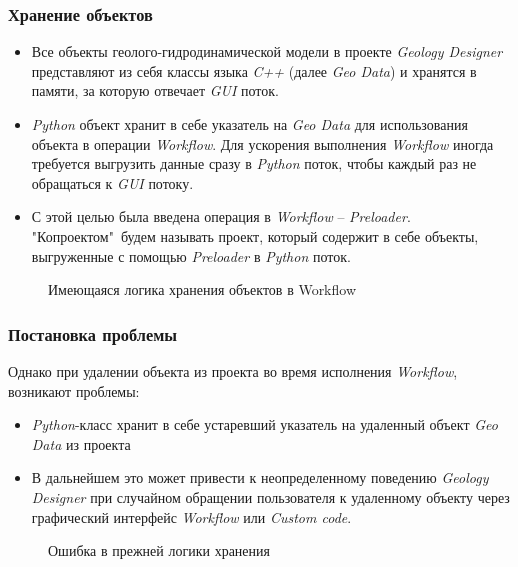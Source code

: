 \documentclass[pdf, 10pt, unicode, aspectratio=169]{beamer} %
\begin{document}
\begin{frame}\frametitle{Хранение объектов}
\begin{itemize}
\item Все объекты геолого-гидродинамической модели в проекте \emph{Geology Designer} представляют из себя классы языка \emph{C++} (далее \emph{Geo Data}) и хранятся в памяти, за которую отвечает \emph{GUI} поток. 
\item \emph{Python} объект хранит в себе указатель на \emph{Geo Data} для использования объекта в операции \emph{Workflow}. Для ускорения выполнения \emph{Workflow} иногда требуется выгрузить данные сразу в \emph{Python} поток, чтобы каждый раз не обращаться к \emph{GUI} потоку.
\item С этой целью была введена операция в \emph{Workflow} -- \emph{Preloader}. "Копроектом"\ будем называть проект, который содержит в себе объекты, выгруженные с помощью \emph{Preloader} в \emph{Python} поток.
\end{itemize}

\begin{figure}[H]	
	\caption{Имеющаяся логика хранения объектов в Workflow}
\end{figure}
\end{frame}
\begin{frame}\frametitle{Постановка проблемы}
Однако при удалении объекта из проекта во время исполнения \emph{Workflow}, возникают проблемы:
\begin{itemize}
	\item\emph{Python}-класс хранит в себе устаревший указатель на удаленный объект \emph{Geo Data} из проекта
	\item В дальнейшем это может привести к неопределенному поведению \emph{Geology Designer} при случайном обращении пользователя к удаленному объекту через графический интерфейс \emph{Workflow} или \emph{Custom code}.
\end{itemize}

\begin{figure}[H]	
	\caption{Ошибка в прежней логики хранения}
\end{figure}
\end{frame}
\end{document}
